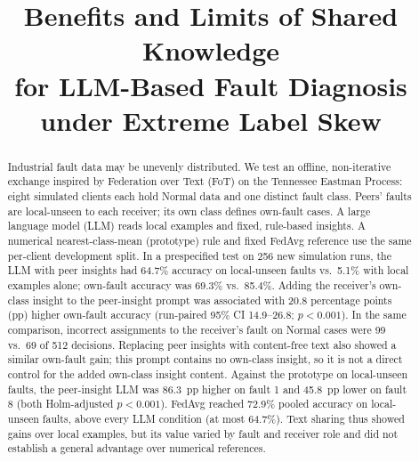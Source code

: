 \documentclass[conference]{IEEEtran}
\begin{document}
\title{Benefits and Limits of Shared Knowledge\\
for LLM-Based Fault Diagnosis\\
under Extreme Label Skew}

\author{%
}

\maketitle

\begin{abstract}
Industrial fault data may be unevenly distributed. We test an offline, non-iterative exchange inspired by Federation over Text (FoT) on the Tennessee Eastman Process: eight simulated clients each hold Normal data and one distinct fault class. Peers' faults are local-unseen to each receiver; its own class defines own-fault cases. A large language model (LLM) reads local examples and fixed, rule-based insights. A numerical nearest-class-mean (prototype) rule and fixed FedAvg reference use the same per-client development split. In a prespecified test on 256 new simulation runs, the LLM with peer insights had 64.7\% accuracy on local-unseen faults vs.\ 5.1\% with local examples alone; own-fault accuracy was 69.3\% vs.\ 85.4\%. Adding the receiver's own-class insight to the peer-insight prompt was associated with 20.8 percentage points (pp) higher own-fault accuracy (run-paired 95\% CI 14.9--26.8; $p<0.001$). In the same comparison, incorrect assignments to the receiver's fault on Normal cases were 99 vs.\ 69 of 512 decisions. Replacing peer insights with content-free text also showed a similar own-fault gain; this prompt contains no own-class insight, so it is not a direct control for the added own-class insight content. Against the prototype on local-unseen faults, the peer-insight LLM was 86.3~pp higher on fault 1 and 45.8~pp lower on fault 8 (both Holm-adjusted $p<0.001$). FedAvg reached 72.9\% pooled accuracy on local-unseen faults, above every LLM condition (at most 64.7\%). Text sharing thus showed gains over local examples, but its value varied by fault and receiver role and did not establish a general advantage over numerical references.

\end{abstract}
\end{document}
